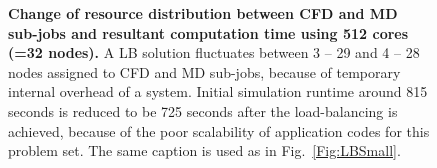 \documentclass[preprint,12pt]{elsarticle}
\begin{document}
\begin{figure}
\centering
{}
\hskip 1cm
\vskip-0.2cm
\caption[]{\small {\bf Change of resource distribution between 
CFD and MD sub-jobs and resultant computation time using 512 cores (=32 nodes).}
A LB solution fluctuates between 3 -- 29 and 4 -- 28 nodes assigned to
CFD and MD sub-jobs, because of temporary internal overhead of a system.
Initial simulation runtime around 815 seconds is reduced to be 725 seconds
after the load-balancing is achieved, because of the poor scalability of 
application codes for this problem set. 
The same caption is used as in Fig.~\ref{Fig:LBSmall}.
}
\label{Fig:LBLarge}
\end{figure}

\end{document}
